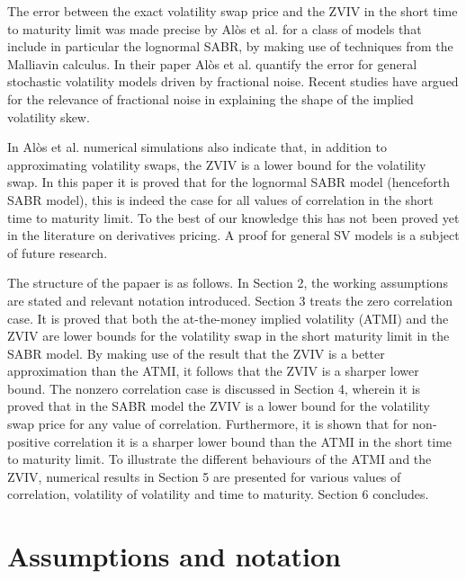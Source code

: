 \documentclass[11pt]{article}
\begin{document}
The error between the exact volatility swap price and the ZVIV in the short time to maturity limit was made precise by Al\`os et al. \cite{ARS} for a class of models that include in particular the lognormal SABR, by making use of techniques from the Malliavin calculus. In their paper Al\`os et al. quantify the error for general stochastic volatility models driven by fractional noise. Recent studies \cite{CR,GJR} have argued for the relevance of fractional noise in explaining the shape of the implied volatility skew.

In Al\`os et al. numerical simulations also indicate that, in addition to approximating volatility swaps, the ZVIV is a lower bound for the volatility swap. In this paper it is proved that for the lognormal SABR model (henceforth SABR model), this is indeed the case for all values of correlation in the short time to maturity limit. To the best of our knowledge this has not been proved yet in the literature on derivatives pricing. A proof for general SV models is a subject of future research.

The structure of the papaer is as follows. In Section 2, the working assumptions are stated and relevant notation introduced. Section 3 treats the zero correlation case. It is proved that both the at-the-money implied volatility (ATMI) and the ZVIV are lower bounds for the volatility swap in the short maturity limit in the SABR model. By making use of the result that the ZVIV is a better approximation than the ATMI, it follows that the ZVIV is a sharper lower bound. The nonzero correlation case is discussed in Section 4, wherein it is proved that in the SABR model the ZVIV is a lower bound for the volatility swap price for any value of correlation. Furthermore, it is shown that for non-positive correlation it is a sharper lower bound than the ATMI in the short time to maturity limit. To illustrate the different behaviours of the ATMI and the ZVIV, numerical results in Section 5 are presented for various values of correlation, volatility of volatility and time to maturity. Section 6 concludes.



\section{Assumptions and notation}
\end{document}
